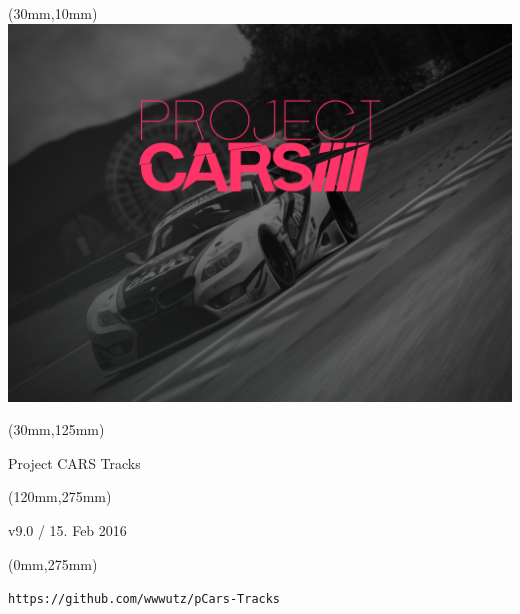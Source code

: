 \documentclass[oneside, a4paper, 12pt]{book}
\begin{document}
\selectfont
\textblockorigin{0cm}{0cm}

\newlength{\Logo}
\setlength{\Logo}{210mm-60mm}
\begin{textblock*}{\Logo}(30mm,10mm)%
\includegraphics[width=\Logo]{pcars-main.png}
\end{textblock*}

\begin{textblock*}{\Logo}(30mm,125mm)%
\begin{center}\Huge{Project CARS Tracks}\end{center}
\end{textblock*}

\begin{textblock*}{90mm}(120mm,275mm)%
\begin{center}\Huge{v9.0 / 15. Feb 2016}\end{center}
\end{textblock*}

\begin{textblock*}{90mm}(0mm,275mm)%
\begin{center}\tt{https://github.com/wwwutz/pCars-Tracks}\end{center}
\end{textblock*}


\null\newpage


\end{document}
